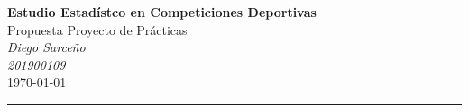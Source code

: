 



%
%
%






\textcolor{DS_Black}{
\begin{minipage}{0.85\textwidth}
    \begin{center}
        \textbf{\Large Estudio Estadístco en Competiciones Deportivas}\\
        \vspace{5pt}
        Propuesta Proyecto de Prácticas \\
        \vspace{20pt}
        \textit{Diego Sarceño} \\
        \vspace{5pt}
        \footnotesize{\textit{201900109}} \\
        \vspace{5pt}
        \today
    \end{center}
\end{minipage}
\vspace{10pt}
\hrule
}